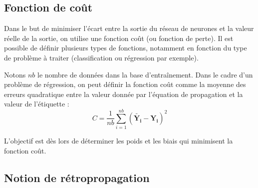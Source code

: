 \subsection{Fonction de coût}
Dans le but de minimiser l'écart entre la sortie du réseau de neurones et la valeur réelle de la sortie, on utilise une fonction coût (ou fonction de perte). Il est possible de définir plusieurs types de fonctions, notamment en fonction du type de problème à traiter (classification ou régression par exemple).

\begin{defi}
Notons $nb$ le nombre de données dans la base d'entraînement. Dans le cadre d'un problème de régression, on peut définir la fonction coût comme la moyenne des erreurs quadratique entre la valeur donnée par l'équation de propagation et la valeur de l'étiquette :
$$
C = \dfrac{1}{nb} \sum \limits_{i=1}^{nb} \left( \mathbf{\tilde{Y_i}} - \mathbf{Y_i}  \right)^2
$$
\end{defi}
\begin{obj}
L'objectif est dès lors de déterminer les poids et les biais qui minimisent la fonction coût.
\end{obj}



\subsection{Notion de rétropropagation}

